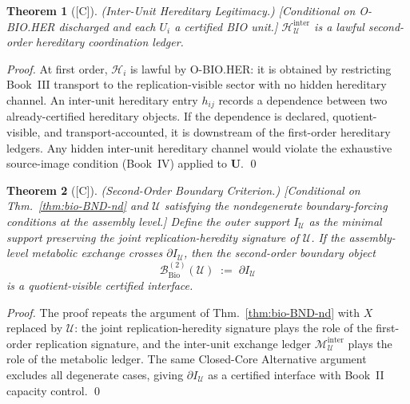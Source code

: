 \documentclass[12pt,oneside]{amsbook}
\theoremstyle{plain}
\newtheorem{theorem}{Theorem}[section]
\theoremstyle{definition}
\theoremstyle{remark}
\newcommand{\status}[1]{\textup{[#1]}}
\begin{document}
\begin{theorem}[\status{C}]\label{thm:bio-inter-hereditary-legitimacy}
\textup{(Inter-Unit Hereditary Legitimacy.)}
\textup{[Conditional on O-BIO.HER discharged and each $U_i$ a
certified BIO unit.]}
$\mathcal{H}_{\mathcal{U}}^{\mathrm{inter}}$ is a lawful second-order
hereditary coordination ledger.
\end{theorem}

\begin{proof}
At first order, $\mathcal{H}_i$ is lawful by O-BIO.HER: it is obtained
by restricting Book~III transport to the replication-visible sector
with no hidden hereditary channel. An inter-unit hereditary entry
$h_{ij}$ records a dependence between two already-certified hereditary
objects. If the dependence is declared, quotient-visible, and
transport-accounted, it is downstream of the first-order hereditary
ledgers. Any hidden inter-unit hereditary channel would violate the
exhaustive source-image condition (Book~IV) applied to $\mathbf{U}$.
\qed
\end{proof}

\begin{theorem}[\status{C}]\label{thm:bio-multi-boundary}
\textup{(Second-Order Boundary Criterion.)}
\textup{[Conditional on Thm.~\ref{thm:bio-BND-nd} and
$\mathcal{U}$ satisfying the nondegenerate boundary-forcing conditions
at the assembly level.]}
Define the outer support $I_{\mathcal{U}}$ as the minimal support
preserving the joint replication-heredity signature of $\mathcal{U}$.
If the assembly-level metabolic exchange crosses
$\partial I_{\mathcal{U}}$, then the second-order boundary object
\[
 \mathcal{B}_{\mathrm{Bio}}^{(2)}(\mathcal{U}) \;:=\; \partial I_{\mathcal{U}}
\]
is a quotient-visible certified interface.
\end{theorem}

\begin{proof}
The proof repeats the argument of Thm.~\ref{thm:bio-BND-nd} with $X$
replaced by $\mathcal{U}$: the joint replication-heredity signature
plays the role of the first-order replication signature, and the
inter-unit exchange ledger $\mathcal{M}_{\mathcal{U}}^{\mathrm{inter}}$
plays the role of the metabolic ledger. The same Closed-Core Alternative
argument excludes all degenerate cases, giving $\partial I_{\mathcal{U}}$
as a certified interface with Book~II capacity control.
\qed
\end{proof}
\end{document}
